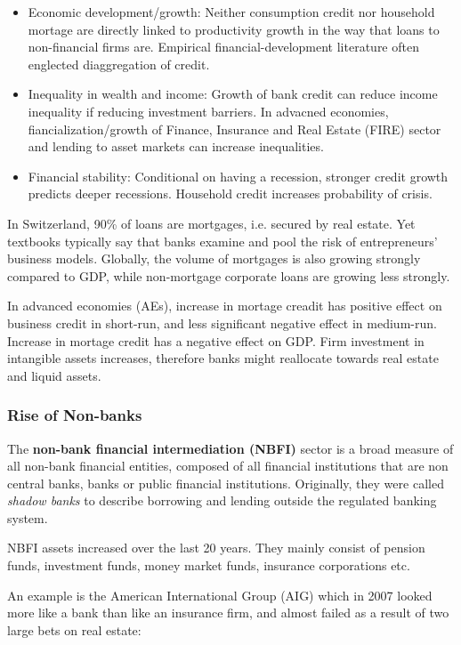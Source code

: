 \documentclass[a4paper]{extarticle}
\begin{document}
\begin{itemize}
    \item Economic development/growth: Neither consumption credit nor household mortage are directly linked to productivity growth in the way that loans to non-financial firms are. Empirical financial-development literature often englected diaggregation of credit.
    \item Inequality in wealth and income: Growth of bank credit can reduce income inequality if reducing investment barriers. In advacned economies, fiancialization/growth of Finance, Insurance and Real Estate (FIRE) sector and lending to asset markets can increase inequalities.
    \item Financial stability: Conditional on having a recession, stronger credit growth predicts deeper recessions. Household credit increases probability of crisis.
\end{itemize}

In Switzerland, 90\% of loans are mortgages, i.e. secured by real estate. Yet textbooks typically say that banks examine and pool the risk of entrepreneurs' business models. Globally, the volume of mortgages is also growing strongly compared to GDP, while non-mortgage corporate loans are growing less strongly.

In advanced economies (AEs), increase in mortage creadit has positive effect on business credit in short-run, and less significant negative effect in medium-run. Increase in mortage credit has a negative effect on GDP. Firm investment in intangible assets increases, therefore banks might reallocate towards real estate and liquid assets.

\subsubsection{Rise of Non-banks}

The \textbf{non-bank financial intermediation (NBFI)} sector is a broad measure of all non-bank financial entities, composed of all financial institutions that are non central banks, banks or public financial institutions. Originally, they were called \textit{shadow banks} to describe borrowing and lending outside the regulated banking system.

NBFI assets increased over the last 20 years. They mainly consist of pension funds, investment funds, money market funds, insurance corporations etc.

An example is the American International Group (AIG) which in 2007 looked more like a bank than like an insurance firm, and almost failed as a result of two large bets on real estate:
\end{document}
